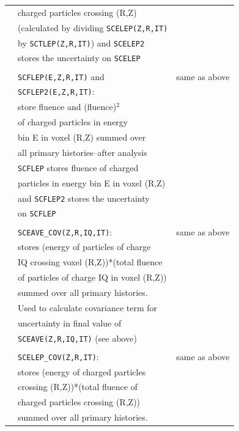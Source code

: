 \documentclass[12pt,twoside]{article}  %
\begin{document}
\begin{longtable}{lll}
         & charged particles crossing (R,Z) &\\
         & (calculated by dividing {\tt SCELEP(Z,R,IT)}&\\
         & by {\tt SCTLEP(Z,R,IT)}) and {\tt SCELEP2}&\\
         & stores the uncertainty on {\tt SCELEP}&\\
         &&\\
         & {\tt SCFLEP(E,Z,R,IT)} and & same as above\\
         & {\tt SCFLEP2(E,Z,R,IT)}: & \\
         & store fluence and (fluence)$^2$ &\\
         & of charged particles in  energy &\\
         & bin E in voxel (R,Z) summed over &\\
         & all primary histories--after analysis &\\
         & {\tt SCFLEP} stores fluence of charged&\\
         & particles in energy bin E in voxel (R,Z) &\\
         & and {\tt SCFLEP2} stores the uncertainty &\\
         & on {\tt SCFLEP}&\\
         &&\\
         & {\tt SCEAVE\_COV(Z,R,IQ,IT)}: & same as above\\
         & stores (energy of particles of charge &\\
         & IQ crossing voxel (R,Z))*(total fluence&\\
         & of particles of charge IQ in voxel (R,Z))&\\
         & summed over all primary histories.&\\
         & Used to calculate covariance term for &\\
         & uncertainty in final value of &\\
         & {\tt SCEAVE(Z,R,IQ,IT)} (see above)&\\
         &&\\
         & {\tt SCELEP\_COV(Z,R,IT)}: & same as above\\
         & stores (energy of charged particles &\\
         & crossing (R,Z))*(total fluence of &\\
         & charged particles crossing (R,Z)) &\\
         & summed over all primary histories.&\\

\end{longtable}
\end{document}
